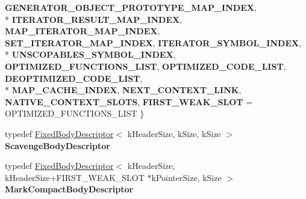 \begin{DoxyCompactItemize}
{\bfseries G\+E\+N\+E\+R\+A\+T\+O\+R\+\_\+\+O\+B\+J\+E\+C\+T\+\_\+\+P\+R\+O\+T\+O\+T\+Y\+P\+E\+\_\+\+M\+A\+P\+\_\+\+I\+N\+D\+E\+X}, 
\\*
{\bfseries I\+T\+E\+R\+A\+T\+O\+R\+\_\+\+R\+E\+S\+U\+L\+T\+\_\+\+M\+A\+P\+\_\+\+I\+N\+D\+E\+X}, 
{\bfseries M\+A\+P\+\_\+\+I\+T\+E\+R\+A\+T\+O\+R\+\_\+\+M\+A\+P\+\_\+\+I\+N\+D\+E\+X}, 
{\bfseries S\+E\+T\+\_\+\+I\+T\+E\+R\+A\+T\+O\+R\+\_\+\+M\+A\+P\+\_\+\+I\+N\+D\+E\+X}, 
{\bfseries I\+T\+E\+R\+A\+T\+O\+R\+\_\+\+S\+Y\+M\+B\+O\+L\+\_\+\+I\+N\+D\+E\+X}, 
\\*
{\bfseries U\+N\+S\+C\+O\+P\+A\+B\+L\+E\+S\+\_\+\+S\+Y\+M\+B\+O\+L\+\_\+\+I\+N\+D\+E\+X}, 
{\bfseries O\+P\+T\+I\+M\+I\+Z\+E\+D\+\_\+\+F\+U\+N\+C\+T\+I\+O\+N\+S\+\_\+\+L\+I\+S\+T}, 
{\bfseries O\+P\+T\+I\+M\+I\+Z\+E\+D\+\_\+\+C\+O\+D\+E\+\_\+\+L\+I\+S\+T}, 
{\bfseries D\+E\+O\+P\+T\+I\+M\+I\+Z\+E\+D\+\_\+\+C\+O\+D\+E\+\_\+\+L\+I\+S\+T}, 
\\*
{\bfseries M\+A\+P\+\_\+\+C\+A\+C\+H\+E\+\_\+\+I\+N\+D\+E\+X}, 
{\bfseries N\+E\+X\+T\+\_\+\+C\+O\+N\+T\+E\+X\+T\+\_\+\+L\+I\+N\+K}, 
{\bfseries N\+A\+T\+I\+V\+E\+\_\+\+C\+O\+N\+T\+E\+X\+T\+\_\+\+S\+L\+O\+T\+S}, 
{\bfseries F\+I\+R\+S\+T\+\_\+\+W\+E\+A\+K\+\_\+\+S\+L\+O\+T} = O\+P\+T\+I\+M\+I\+Z\+E\+D\+\_\+\+F\+U\+N\+C\+T\+I\+O\+N\+S\+\_\+\+L\+I\+S\+T
 \}\label{classv8_1_1internal_1_1_context_a30cccf11faad7c04f0675ea03e533ef6}

\item 
\hypertarget{classv8_1_1internal_1_1_context_a5ac8f9571a52ad9278ddfdf3d1eb6dc4}{}typedef \hyperlink{classv8_1_1internal_1_1_fixed_body_descriptor}{Fixed\+Body\+Descriptor}$<$ k\+Header\+Size, k\+Size, k\+Size $>$ {\bfseries Scavenge\+Body\+Descriptor}\label{classv8_1_1internal_1_1_context_a5ac8f9571a52ad9278ddfdf3d1eb6dc4}

\item 
\hypertarget{classv8_1_1internal_1_1_context_add51c233d5f787faaf5bc97e861db07e}{}typedef \hyperlink{classv8_1_1internal_1_1_fixed_body_descriptor}{Fixed\+Body\+Descriptor}$<$ k\+Header\+Size, k\+Header\+Size+F\+I\+R\+S\+T\+\_\+\+W\+E\+A\+K\+\_\+\+S\+L\+O\+T $\ast$k\+Pointer\+Size, k\+Size $>$ {\bfseries Mark\+Compact\+Body\+Descriptor}\label{classv8_1_1internal_1_1_context_add51c233d5f787faaf5bc97e861db07e}

\end{DoxyCompactItemize}
